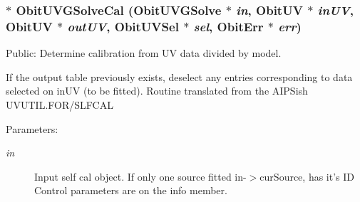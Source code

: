 \subsubsection{$\ast$ Obit\-UVGSolve\-Cal ({\bf Obit\-UVGSolve} $\ast$ {\em in}, {\bf Obit\-UV} $\ast$ {\em in\-UV}, {\bf Obit\-UV} $\ast$ {\em out\-UV}, {\bf Obit\-UVSel} $\ast$ {\em sel}, {\bf Obit\-Err} $\ast$ {\em err})}\label{ObitUVGSolve_8c_a17}


Public: Determine calibration from UV data divided by model. 

If the output table previously exists, deselect any entries corresponding to data selected on in\-UV (to be fitted). Routine translated from the AIPSish UVUTIL.FOR/SLFCAL \begin{Desc}
\item[Parameters:]
\begin{description}
\item[{\em in}]Input self cal object. If only one source fitted in-$>$cur\-Source, has it's ID Control parameters are on the info member. \begin{itemize}

\end{itemize}
\end{description}
\end{Desc}
